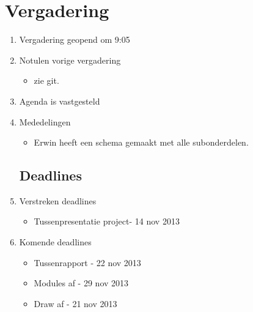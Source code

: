\documentclass{article}
\begin{document}
\section*{Vergadering}
\begin{enumerate}
	
	\subsection*{Vooraf}
	\item Vergadering geopend om 9:05 %
	\item Notulen vorige vergadering
	\begin{itemize}
		\item zie git.
	\end{itemize}
	\item Agenda is vastgesteld
	\item Mededelingen
	\begin{itemize}
		\item Erwin heeft een schema gemaakt met alle subonderdelen.
	\end{itemize}

	\subsection*{Deadlines}
	\item Verstreken deadlines
	\begin{itemize}
		\item Tussenpresentatie project- 14 nov 2013
	\end{itemize}
	\item Komende deadlines
	\begin{itemize}
		\item Tussenrapport - 22 nov 2013
		\item Modules af - 29 nov 2013
		\item Draw af - 21 nov 2013
	\end{itemize}

	


\end{enumerate}
\end{document}
